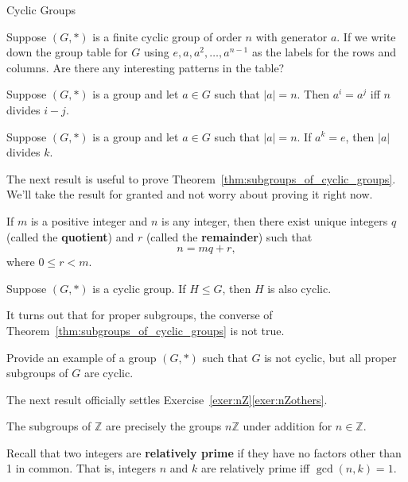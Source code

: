 \begin{section}{Cyclic Groups}
\begin{exercise}
Suppose $(G,*)$ is a finite cyclic group of order $n$ with generator $a$.  If we write down the group table for $G$ using $e, a, a^2, \ldots, a^{n-1}$ as the labels for the rows and columns.  Are there any interesting patterns in the table?
\end{exercise}

\begin{theorem}
Suppose $(G,*)$ is a group and let $a\in G$ such that $|a|=n$.  Then $a^i=a^j$ iff $n$ divides $i-j$.
\end{theorem}

\begin{corollary}
Suppose $(G,*)$ is a group and let $a\in G$ such that $|a|=n$.  If $a^k=e$, then $|a|$ divides $k$.
\end{corollary}

The next result is useful to prove Theorem~\ref{thm:subgroups_of_cyclic_groups}.  We'll take the result for granted and not worry about proving it right now.

\begin{theorem}
If $m$ is a positive integer and $n$ is any integer, then there exist unique integers $q$ (called the \textbf{quotient}) and $r$ (called the \textbf{remainder}) such that
\[
n=mq+r,
\]
where $0\leq r<m$.
\end{theorem}

\begin{theorem}\label{thm:subgroups_of_cyclic_groups}
Suppose $(G,*)$ is a cyclic group. If $H\leq G$, then $H$ is also cyclic.
\end{theorem}

It turns out that for proper subgroups, the converse of Theorem~\ref{thm:subgroups_of_cyclic_groups} is not true.

\begin{exercise}
Provide an example of a group $(G,*)$ such that $G$ is not cyclic, but all proper subgroups of $G$ are cyclic.
\end{exercise}

The next result officially settles Exercise~\ref{exer:nZ}\ref{exer:nZothers}.

\begin{corollary}
The subgroups of $\mathbb{Z}$ are precisely the groups $n\mathbb{Z}$ under addition for $n\in \mathbb{Z}$.
\end{corollary}

Recall that two integers are \textbf{relatively prime} if they have no factors other than 1 in common.  That is, integers $n$ and $k$ are relatively prime iff $\gcd(n,k)=1$.


\end{section}
